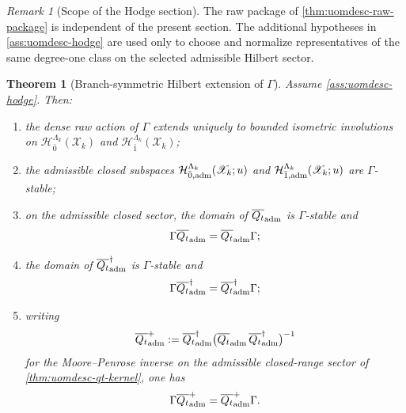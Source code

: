 \documentclass[11pt]{article}
\theoremstyle{definition}
\theoremstyle{plain}
\newtheorem{theorem}[definition]{Theorem}
\theoremstyle{remark}
\newtheorem{remark}[definition]{Remark}
\newcommand{\Xscr}{\mathscr X}
\newcommand{\Qt}{Q_t}
\begin{document}
\begin{remark}[Scope of the Hodge section]
\label{rem:uomdesc-hodge-scope}
The raw package of \cref{thm:uomdesc-raw-package} is independent of the present section.
The additional hypotheses in \cref{ass:uomdesc-hodge} are used only to choose and normalize
representatives of the same degree-one class on the selected admissible Hilbert sector.
\end{remark}

\begin{theorem}[Branch-symmetric Hilbert extension of \texorpdfstring{\(\Gamma\)}{Gamma}]
\label{thm:uomdesc-gamma-hilbert}
Assume \cref{ass:uomdesc-hodge}.
Then:
\begin{enumerate}[leftmargin=2em]
\item the dense raw action of \(\Gamma\) extends uniquely to bounded isometric involutions on
  \(\mathcal H_{\bar 0}^{\Lambda_k}(\Xscr_k)\) and \(\mathcal H_{\bar 1}^{\Lambda_k}(\Xscr_k)\);
\item the admissible closed subspaces
  \(
  \mathcal H_{\bar 0,{\rm adm}}^{\Lambda_k}(\Xscr_k;u)
  \)
  and
  \(
  \mathcal H_{\bar 1,{\rm adm}}^{\Lambda_k}(\Xscr_k;u)
  \)
  are \(\Gamma\)-stable;
\item on the admissible closed sector, the domain of \(\overline{\Qt}_{\rm adm}\) is
  \(\Gamma\)-stable and
  \[
  \Gamma\overline{\Qt}_{\rm adm}=\overline{\Qt}_{\rm adm}\Gamma;
  \]
\item the domain of \(\overline{\Qt}_{\rm adm}^{\dagger}\) is \(\Gamma\)-stable and
  \[
  \Gamma\overline{\Qt}_{\rm adm}^{\dagger}=\overline{\Qt}_{\rm adm}^{\dagger}\Gamma;
  \]
\item writing
  \[
  \overline{\Qt}_{\rm adm}^{+}
  :=
  \overline{\Qt}_{\rm adm}^{\dagger}
  \big(\overline{\Qt}_{\rm adm}\,\overline{\Qt}_{\rm adm}^{\dagger}\big)^{-1}
  \]
  for the Moore--Penrose inverse on the admissible closed-range sector of
  \cref{thm:uomdesc-qt-kernel}, one has
  \[
  \Gamma\overline{\Qt}_{\rm adm}^{+}=\overline{\Qt}_{\rm adm}^{+}\Gamma.
  \]
\end{enumerate}
\end{theorem}
\end{document}
